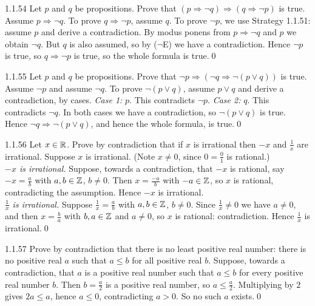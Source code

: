 \begin{bookex}[recommended]{1.1.54}
Let $p$ and $q$ be propositions. Prove that $(p\Rightarrow\neg q)\Rightarrow(q\Rightarrow\neg p)$ is true.
\solution
Assume $p\Rightarrow\neg q$. To prove $q\Rightarrow\neg p$, assume $q$. To prove $\neg p$, we use Strategy 1.1.51: assume $p$ and derive a contradiction. By modus ponens from $p\Rightarrow\neg q$ and $p$ we obtain $\neg q$. But $q$ is also assumed, so by ($\neg$E) we have a contradiction. Hence $\neg p$ is true, so $q\Rightarrow\neg p$ is true, so the whole formula is true.\qed
\end{bookex}

\begin{bookex}[recommended]{1.1.55}
Let $p$ and $q$ be propositions. Prove that $\neg p\Rightarrow(\neg q\Rightarrow\neg(p\vee q))$ is true.
\solution
Assume $\neg p$ and assume $\neg q$. To prove $\neg(p\vee q)$, assume $p\vee q$ and derive a contradiction, by cases. \emph{Case 1:} $p$. This contradicts $\neg p$. \emph{Case 2:} $q$. This contradicts $\neg q$. In both cases we have a contradiction, so $\neg(p\vee q)$ is true. Hence $\neg q\Rightarrow\neg(p\vee q)$, and hence the whole formula, is true.\qed
\end{bookex}

\begin{bookex}[essential]{1.1.56}
Let $x\in\mathbb{R}$. Prove by contradiction that if $x$ is irrational then $-x$ and $\frac1x$ are irrational.
\solution
Suppose $x$ is irrational. (Note $x\ne0$, since $0=\frac01$ is rational.)\\
\emph{$-x$ is irrational.} Suppose, towards a contradiction, that $-x$ is rational, say $-x=\frac ab$ with $a,b\in\mathbb{Z}$, $b\ne0$. Then $x=\frac{-a}{b}$ with $-a\in\mathbb{Z}$, so $x$ is rational, contradicting the assumption. Hence $-x$ is irrational.\\
\emph{$\frac1x$ is irrational.} Suppose $\frac1x=\frac ab$ with $a,b\in\mathbb{Z}$, $b\ne0$. Since $\frac1x\ne0$ we have $a\ne0$, and then $x=\frac ba$ with $b,a\in\mathbb{Z}$ and $a\ne0$, so $x$ is rational: contradiction. Hence $\frac1x$ is irrational.\qed
\end{bookex}

\begin{bookex}[essential]{1.1.57}
Prove by contradiction that there is no least positive real number: there is no positive real $a$ such that $a\le b$ for all positive real $b$.
\solution
Suppose, towards a contradiction, that $a$ is a positive real number such that $a\le b$ for every positive real number $b$. Then $b=\frac a2$ is a positive real number, so $a\le\frac a2$. Multiplying by $2$ gives $2a\le a$, hence $a\le0$, contradicting $a>0$. So no such $a$ exists.\qed
\end{bookex}

